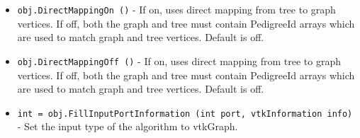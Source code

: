 \begin{itemize}
\item  \verb|obj.DirectMappingOn ()| -  If on, uses direct mapping from tree to graph vertices.
 If off, both the graph and tree must contain PedigreeId arrays
 which are used to match graph and tree vertices.
 Default is off.

\item  \verb|obj.DirectMappingOff ()| -  If on, uses direct mapping from tree to graph vertices.
 If off, both the graph and tree must contain PedigreeId arrays
 which are used to match graph and tree vertices.
 Default is off.

\item  \verb|int = obj.FillInputPortInformation (int port, vtkInformation info)| -  Set the input type of the algorithm to vtkGraph.

\end{itemize}
